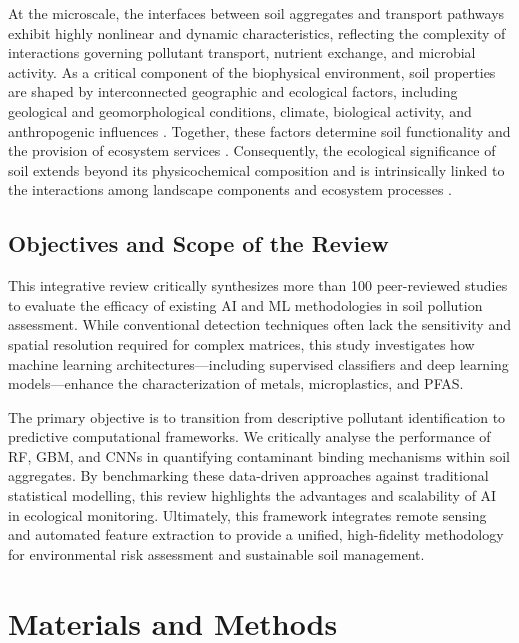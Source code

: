 \documentclass[environments,article,submit,pdftex,moreauthors]{Definitions/mdpi}
\begin{document}
At the microscale, the interfaces between soil aggregates and transport
pathways exhibit highly nonlinear and dynamic characteristics, reflecting the
complexity of interactions governing pollutant transport, nutrient exchange,
and microbial activity. As a critical component of the biophysical environment,
soil properties are shaped by interconnected geographic and ecological factors,
including geological and geomorphological conditions, climate, biological
activity, and anthropogenic influences \cite{Wangetal2010,Brevik2015,Wu168627}.
Together, these factors determine soil functionality and the provision of
ecosystem services \cite{Baveye2016,Klaucol2013,Klaucol2017}.
Consequently, the ecological significance of soil extends beyond its
physicochemical composition and is intrinsically linked to the interactions
among landscape components and ecosystem processes \cite{geomatics5010005}.

\subsection{Objectives and Scope of the Review}\label{sec1.3}

This integrative review critically synthesizes more than 100 peer-reviewed
studies to evaluate the efficacy of existing AI and ML methodologies in soil
pollution assessment. While conventional detection techniques often lack the
sensitivity and spatial resolution required for complex matrices, this study
investigates how machine learning architectures---including supervised
classifiers and deep learning models---enhance the characterization of metals,
microplastics, and PFAS.

The primary objective is to transition from descriptive pollutant
identification to predictive computational frameworks. We critically analyse
the performance of RF, GBM, and CNNs in quantifying contaminant binding
mechanisms within soil aggregates. By benchmarking these data-driven
approaches against traditional statistical modelling, this review highlights
the advantages and scalability of AI in ecological monitoring. Ultimately,
this framework integrates remote sensing and automated feature extraction to
provide a unified, high-fidelity methodology for environmental risk assessment
and sustainable soil management.

\section{Materials and Methods}\label{sec2}
\end{document}
